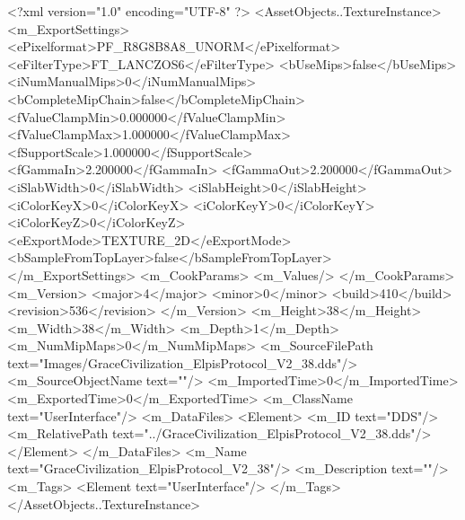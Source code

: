 <?xml version="1.0" encoding="UTF-8" ?>
<AssetObjects..TextureInstance>
	<m_ExportSettings>
		<ePixelformat>PF_R8G8B8A8_UNORM</ePixelformat>
		<eFilterType>FT_LANCZOS6</eFilterType>
		<bUseMips>false</bUseMips>
		<iNumManualMips>0</iNumManualMips>
		<bCompleteMipChain>false</bCompleteMipChain>
		<fValueClampMin>0.000000</fValueClampMin>
		<fValueClampMax>1.000000</fValueClampMax>
		<fSupportScale>1.000000</fSupportScale>
		<fGammaIn>2.200000</fGammaIn>
		<fGammaOut>2.200000</fGammaOut>
		<iSlabWidth>0</iSlabWidth>
		<iSlabHeight>0</iSlabHeight>
		<iColorKeyX>0</iColorKeyX>
		<iColorKeyY>0</iColorKeyY>
		<iColorKeyZ>0</iColorKeyZ>
		<eExportMode>TEXTURE_2D</eExportMode>
		<bSampleFromTopLayer>false</bSampleFromTopLayer>
	</m_ExportSettings>
	<m_CookParams>
		<m_Values/>
	</m_CookParams>
	<m_Version>
		<major>4</major>
		<minor>0</minor>
		<build>410</build>
		<revision>536</revision>
	</m_Version>
	<m_Height>38</m_Height>
	<m_Width>38</m_Width>
	<m_Depth>1</m_Depth>
	<m_NumMipMaps>0</m_NumMipMaps>
	<m_SourceFilePath text="Images/GraceCivilization_ElpisProtocol_V2_38.dds"/>
	<m_SourceObjectName text=""/>
	<m_ImportedTime>0</m_ImportedTime>
	<m_ExportedTime>0</m_ExportedTime>
	<m_ClassName text="UserInterface"/>
	<m_DataFiles>
		<Element>
			<m_ID text="DDS"/>
			<m_RelativePath text="../GraceCivilization_ElpisProtocol_V2_38.dds"/>
		</Element>
	</m_DataFiles>
	<m_Name text="GraceCivilization_ElpisProtocol_V2_38"/>
	<m_Description text=""/>
	<m_Tags>
		<Element text="UserInterface"/>
	</m_Tags>
</AssetObjects..TextureInstance>
